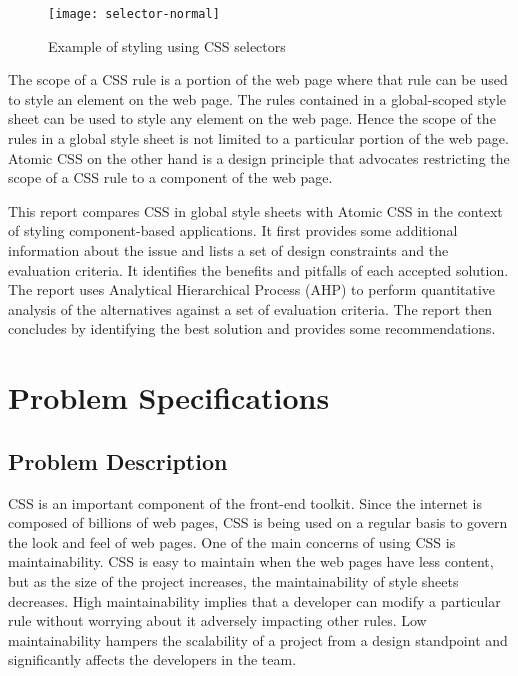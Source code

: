 \documentclass[12pt]{article}
\begin{document}
\vspace{0.5cm}

\begin{figure}[h]
\texttt{[image: selector-normal]}
\centering
\caption{Example of styling using CSS selectors}
\end{figure}

\vspace{0.5cm}

The scope of a CSS rule is a portion of the web page where that rule can be used to style an element on the web page. The rules contained in a global-scoped style sheet can be used to style any element on the web page. Hence the scope of the rules in a global style sheet is not limited to a particular portion of the web page. Atomic CSS on the other hand is a design principle that advocates restricting the scope of a CSS rule to a component of the web page.

This report compares CSS in global style sheets with Atomic CSS in the context of styling component-based applications. It first provides some additional information about the issue and lists a set of design constraints and the evaluation criteria. It identifies the benefits and pitfalls of each accepted solution. The report uses Analytical Hierarchical Process (AHP) to perform quantitative analysis of the alternatives against a set of evaluation criteria. The report then concludes by identifying the best solution and provides some recommendations.

\newpage

\section{Problem Specifications}
\subsection{Problem Description}
CSS is an important component of the front-end toolkit. Since the internet is composed of billions of web pages, CSS is being used on a regular basis to govern the look and feel of web pages. One of the main concerns of using CSS is maintainability. CSS is easy to maintain when the web pages have less content, but as the size of the project increases, the maintainability of style sheets decreases. High maintainability implies that a developer can modify a particular rule without worrying about it adversely impacting other rules. Low maintainability hampers the scalability of a project from a design standpoint and significantly affects the developers in the team.
\end{document}
